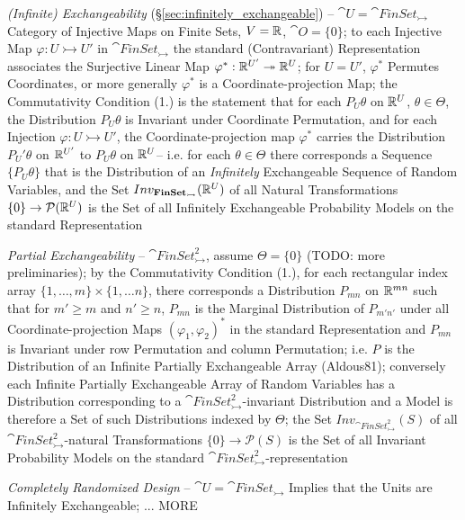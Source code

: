 \emph{(Infinite) Exchangeability} (\S\ref{sec:infinitely_exchangeable}) --
$\cat{U} = \cat{FinSet}_\rightarrowtail$ Category of Injective Maps on Finite
Sets, $V = \mathbb{R}$, $\cat{O} = \{ 0 \}$; to each Injective Map
$\varphi : U \rightarrowtail U'$ in $\cat{FinSet}_\rightarrowtail$ the standard
(Contravariant) Representation associates the Surjective Linear Map
$\varphi^* : \mathbb{R}^{U'} \twoheadrightarrow \mathbb{R}^{U}$; for $U = U'$,
$\varphi^*$ Permutes Coordinates, or more generally $\varphi^*$ is a
Coordinate-projection Map; the Commutativity Condition (1.) is the statement
that for each $P_U\theta$ on $\mathbb{R}^U$, $\theta \in \Theta$, the Distribution
$P_U \theta$ is Invariant under Coordinate Permutation, and for each Injection
$\varphi : U \rightarrowtail U'$, the Coordinate-projection map $\varphi^*$
carries the Distribution $P_U'\theta$ on $\mathbb{R}^{U'}$ to $P_U\theta$ on
$\mathbb{R}^U$-- i.e. for each $\theta \in \Theta$ there corresponds a Sequence
$\{ P_U\theta \}$ that is the Distribution of an \emph{Infinitely} Exchangeable
Sequence of Random Variables, and the Set
$Inv_{\mathbf{FinSet}_\rightarrowtail}(\mathbb{R}^U)$ of all Natural Transformations
$\{0\} \to \mathcal{P}(\mathbb{R}^U)$ is the Set of all Infinitely Exchangeable
Probability Models on the standard Representation

\emph{Partial Exchangeability} -- $\cat{FinSet}_\rightarrowtail^2$, assume
$\Theta = \{0\}$ (TODO: more preliminaries); by the Commutativity Condition
(1.), for each rectangular index array
$\{1, \ldots, m\} \times \{1, \ldots n\}$, there corresponds a Distribution
$P_{mn}$ on $\mathbb{R}^{mn}$ such that for $m' \geq m$ and $n' \geq n$, $P_{mn}$ is
the Marginal Distribution of $P_{m'n'}$ under all Coordinate-projection Maps
$(\varphi_1, \varphi_2)^*$ in the standard Representation and $P_{mn}$ is
Invariant under row Permutation and column Permutation; i.e. $P$ is the
Distribution of an Infinite Partially Exchangeable Array (Aldous81); conversely
each Infinite Partially Exchangeable Array of Random Variables has a
Distribution corresponding to a $\cat{FinSet}_\rightarrowtail^2$-invariant
Distribution and a Model is therefore a Set of such Distributions indexed by
$\Theta$; the Set $Inv_{\cat{FinSet}_\rightarrowtail^2}(S)$ of all
$\cat{FinSet}_\rightarrowtail^2$-natural Transformations
$\{0\} \to \mathcal{P}(S)$ is the Set of all Invariant Probability Models on the
standard $\cat{FinSet}_\rightarrowtail^2$-representation

\emph{Completely Randomized Design} -- $\cat{U} = \cat{FinSet}_\rightarrowtail$
Implies that the Units are Infinitely Exchangeable; ... MORE


